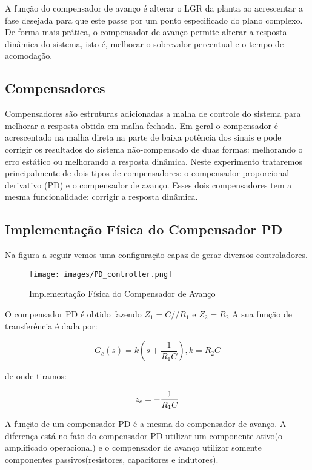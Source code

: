 A função do compensador de avanço é alterar o LGR da planta ao acrescentar a fase desejada para que este passe por um ponto especificado do plano complexo. De forma mais prática, o compensador de avanço permite alterar a resposta dinâmica do sistema, isto é, melhorar o sobrevalor percentual e o tempo de acomodação.

\subsection{Compensadores}

Compensadores são estruturas adicionadas a malha de controle do sistema para melhorar a resposta obtida em malha fechada. Em geral o compensador é acrescentado na malha direta na parte de baixa potência dos sinais e pode corrigir os resultados do sistema não-compensado de duas formas: melhorando o erro estático ou melhorando a resposta dinâmica. Neste experimento trataremos principalmente de 
dois tipos de compensadores: o compensador proporcional derivativo (PD) e o compensador de avanço. Esses dois compensadores tem a mesma funcionalidade: corrigir a resposta dinâmica.

\subsection{Implementação Física do Compensador PD}
Na figura a seguir vemos uma configuração  capaz de gerar diversos controladores.
\begin{figure}[H]
\centering
\texttt{[image: images/PD\_controller.png]}
\caption{Implementação Física do Compensador de Avanço}
\label{fig:avanco-fisico}
\end{figure}

O compensador PD é obtido fazendo $Z_1 = C//R_1$ e $Z_2 = R_2$
A sua função de transferência é dada por:

\begin{equation}
    G_c(s) = k(s + \frac{1}{R_1 C}), k = R_2 C
\end{equation}

de onde tiramos:

\begin{equation}
    z_c = -\frac{1}{R_1C}  \\
\end{equation}

A função de um compensador PD é a mesma do compensador de avanço. A diferença está no fato do compensador PD utilizar um componente ativo(o amplificado operacional) e o compensador de avanço utilizar somente componentes passivos(resistores, capacitores e indutores).

